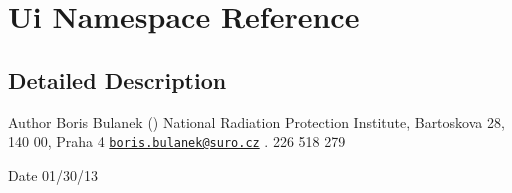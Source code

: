 \hypertarget{namespaceUi}{\section{Ui Namespace Reference}
\label{namespaceUi}
}


\subsection{Detailed Description}
\begin{DoxyAuthor}{Author}
Boris Bulanek ()  National Radiation Protection Institute, Bartoskova 28, 140 00, Praha 4  \href{mailto:boris.bulanek@suro.cz}{\tt boris.\-bulanek@suro.\-cz} . 226 518 279 
\end{DoxyAuthor}
\begin{DoxyDate}{Date}
01/30/13 
\end{DoxyDate}
